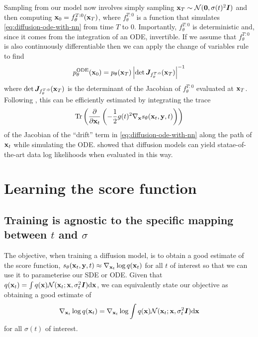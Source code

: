 Sampling from our model now involves simply sampling ${\mathbf{x}}_T \sim {\mathcal{N}}({\bm{0}}, \sigma(t)^2{\bm{I}})$ and then computing ${\mathbf{x}}_0 = f^{T:0}_\theta({\mathbf{x}}_T)$, where $f^{T:0}_\theta$ is a function that simulates \cref{eq:diffusion-ode-with-nn} from time $T$ to $0$. Importantly, $f^{T:0}_\theta$ is deterministic and, since it comes from the integration of an ODE, invertible. If we assume that $f^{T:0}_\theta$ is also continuously differentiable then we can apply the change of variables rule to find
\begin{equation}
    p_\theta^\text{ODE}({\mathbf{x}}_0) = p_\theta({\mathbf{x}}_T) \left| \det {\bm{J}}_{f^{T:0}_\theta}({\mathbf{x}}_T) \right|^{-1}
\end{equation}
where $\det {\bm{J}}_{f^{T:0}_\theta}({\mathbf{x}}_T)$ is the determinant of the Jacobian of $f^{T:0}_\theta$ evaluated at ${\mathbf{x}}_T$. Following \citet{chen2018neural}, this can be efficiently estimated by integrating the trace
\begin{equation}
    \text{Tr}\left( \frac{\partial}{\partial {\mathbf{x}}_t} \left( - \frac{1}{2} g(t)^2 \nabla_{\mathbf{x}} s_\theta({\mathbf{x}}_t, {\mathbf{y}}, t) \right)
    \right)
\end{equation}
of the Jacobian of the ``drift'' term in \cref{eq:diffusion-ode-with-nn} along the path of ${\mathbf{x}}_t$ while simulating the ODE. \citet{song2020score} showed that diffusion models can yield statae-of-the-art data log likelihoods when evaluated in this way.




\section{Learning the score function} \label{sec:diffusion-training}

\subsection{Training is agnostic to the specific mapping between $t$ and $\sigma$}
The objective, when training a diffusion model, is to obtain a good estimate of the score function, $s_\theta({\mathbf{x}}_t, {\mathbf{y}}, t) \approx \nabla_{{\mathbf{x}}_t} \log q({\mathbf{x}}_t)$ for all $t$ of interest so that we can use it to parameterise our SDE or ODE. Given that $q({\mathbf{x}}_t) = \int q({\mathbf{x}}) {\mathcal{N}}({\mathbf{x}}_t; {\mathbf{x}}, \sigma_t^2{\bm{I}}) \mathrm{d}{\mathbf{x}}$, we can equivalently state our objective as obtaining a good estimate of 
\begin{equation}
\nabla_{{\mathbf{x}}_t} \log q({\mathbf{x}}_t) = \nabla_{{\mathbf{x}}_t} \log \int q({\mathbf{x}}) {\mathcal{N}}({\mathbf{x}}_t; {\mathbf{x}}, \sigma_t^2{\bm{I}}) \mathrm{d}{\mathbf{x}}
\end{equation}
for all $\sigma(t)$ of interest.

